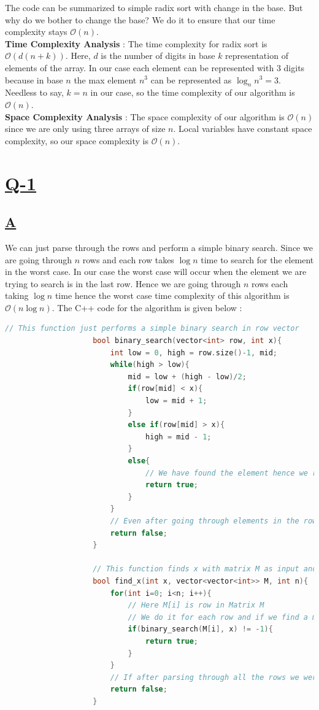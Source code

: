 \documentclass[14pt]{article}
\begin{document}
			The code can be summarized to simple radix sort with change in the base. But why do we bother to change the base? We do it to ensure that our time complexity stays $\mathcal{O}(n)$.\\
			\textbf{Time Complexity Analysis }: The time complexity for radix sort is $\mathcal{O}(d(n+k))$. Here, $d$ is the number of digits in base $k$ representation of elements of the array. In our case each element can be represented with 3 digits because in base $n$ the max element $n^3$ can be represented as $\log_n{n^3} = 3$. Needless to say, $k=n$ in our case, so the time complexity of our algorithm is $\mathcal{O}(n)$.\\
			\linebreak
			\textbf{Space Complexity Analysis }: The space complexity of our algorithm is $\mathcal{O}(n)$ since we are only using three arrays of size $n$. Local variables have constant space complexity, so our space complexity is $\mathcal{O}(n)$.
			
		\section*{\underline{Q-1}}
			\subsection*{\underline{A}}
				We can just parse through the rows and perform a simple binary search. Since we are going through $n$ rows and each row takes $\log{n}$ time to search for the element in the worst case. In our case the worst case will occur when the element we are trying to search is in the last row. Hence we are going through $n$ rows each taking $\log{n}$ time hence the worst case time complexity of this algorithm is $\mathcal{O}(n\log{n})$. The C++ code for the algorithm is given below :
				\begin{lstlisting}[language=C++]
					// This function just performs a simple binary search in row vector
					bool binary_search(vector<int> row, int x){
						int low = 0, high = row.size()-1, mid;
						while(high > low){
							mid = low + (high - low)/2;
							if(row[mid] < x){
								low = mid + 1;
							}
							else if(row[mid] > x){
								high = mid - 1;
							} 
							else{
								// We have found the element hence we return true
								return true;
							}
						}
						// Even after going through elements in the row, we were not able to find the element
						return false;
					}
					
					// This function finds x with matrix M as input and the dimension of the matrix is n * n
					bool find_x(int x, vector<vector<int>> M, int n){
						for(int i=0; i<n; i++){
							// Here M[i] is row in Matrix M
							// We do it for each row and if we find a match, we return true
							if(binary_search(M[i], x) != -1){
								return true;
							}
						}
						// If after parsing through all the rows we were not able to find the element we return false
						return false;
					}
				\end{lstlisting}
			\newpage
			
\end{document}
